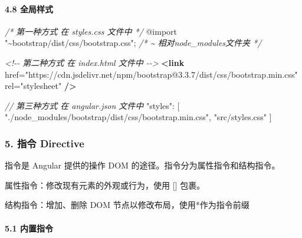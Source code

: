 \documentclass[
]{article}
\newenvironment{Shaded}{}{}
\newcommand{\CommentTok}[1]{\textcolor[rgb]{0.38,0.63,0.69}{\textit{#1}}}
\newcommand{\ImportTok}[1]{#1}
\newcommand{\KeywordTok}[1]{\textcolor[rgb]{0.00,0.44,0.13}{\textbf{#1}}}
\newcommand{\NormalTok}[1]{#1}
\newcommand{\OperatorTok}[1]{\textcolor[rgb]{0.40,0.40,0.40}{#1}}
\newcommand{\OtherTok}[1]{\textcolor[rgb]{0.00,0.44,0.13}{#1}}
\newcommand{\StringTok}[1]{\textcolor[rgb]{0.25,0.44,0.63}{#1}}
\begin{document}
\hypertarget{48-ux5168ux5c40ux6837ux5f0f}{%
\paragraph{4.8 全局样式}\label{48-ux5168ux5c40ux6837ux5f0f}}

\begin{Shaded}
\begin{Highlighting}[]
\CommentTok{/* 第一种方式 在 styles.css 文件中 */}
\ImportTok{@import} \StringTok{"\textasciitilde{}bootstrap/dist/css/bootstrap.css"}\OperatorTok{;}
\CommentTok{/* \textasciitilde{} 相对node\_modules文件夹 */}
\end{Highlighting}
\end{Shaded}

\begin{Shaded}
\begin{Highlighting}[]
\CommentTok{\textless{}!{-}{-} 第二种方式 在 index.html 文件中  {-}{-}\textgreater{}}
\KeywordTok{\textless{}link}\OtherTok{ href=}\StringTok{"https://cdn.jsdelivr.net/npm/bootstrap@3.3.7/dist/css/bootstrap.min.css"}\OtherTok{ rel=}\StringTok{"stylesheet"} \KeywordTok{/\textgreater{}}
\end{Highlighting}
\end{Shaded}

\begin{Shaded}
\begin{Highlighting}[]
\CommentTok{// 第三种方式 在 angular.json 文件中}
\StringTok{"styles"}\OperatorTok{:}\NormalTok{ [}
  \StringTok{"./node\_modules/bootstrap/dist/css/bootstrap.min.css"}\OperatorTok{,}
  \StringTok{"src/styles.css"}
\NormalTok{]}
\end{Highlighting}
\end{Shaded}

\hypertarget{5-ux6307ux4ee4-directive}{%
\subsubsection{5. 指令 Directive}\label{5-ux6307ux4ee4-directive}}

指令是 Angular 提供的操作 DOM 的途径。指令分为属性指令和结构指令。

属性指令：修改现有元素的外观或行为，使用 {[}{]} 包裹。

结构指令：增加、删除 DOM 节点以修改布局，使用*作为指令前缀

\hypertarget{51-ux5185ux7f6eux6307ux4ee4}{%
\paragraph{5.1 内置指令}\label{51-ux5185ux7f6eux6307ux4ee4}}
\end{document}
